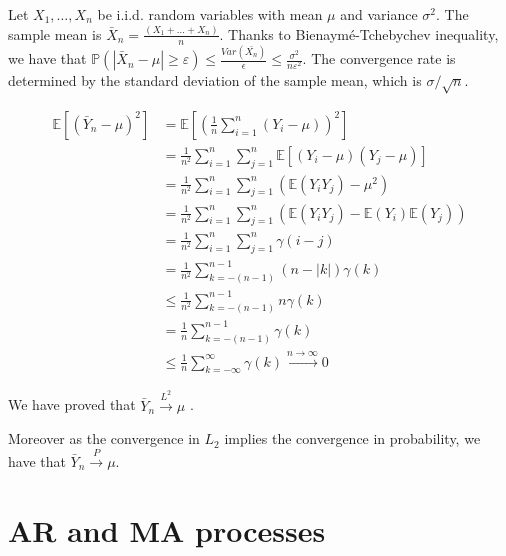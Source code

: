 \documentclass[11pt]{article}
\begin{document}
\begin{solution}  %

    Let $X_1, \dots, X_n$ be i.i.d. random variables with mean $\mu$ and variance $\sigma^2$. The sample mean  is $\bar{X}_n = \frac{(X_1+\dots+X_n)}{n}$. 
    Thanks to Bienaymé-Tchebychev inequality, we have that $\mathbb{P} (|\bar{X}_n - \mu| \geq \varepsilon) \leq  \frac{Var(\bar{X_n})}{\epsilon} \leq \frac{\sigma^2}{n\varepsilon^2}$.
    The convergence rate is determined by the standard deviation of the sample mean, which is $\sigma/\sqrt{n}$.

    \begin{align}
        \mathbb{E}[(\bar{Y}_n-\mu)^2] &= \mathbb{E}[(\frac{1}{n} \sum_{i=1}^n( Y_i - \mu))^2] \\
        &= \frac{1}{n^2} \sum_{i=1}^n \sum_{j=1}^n \mathbb{E}[(Y_i-\mu)(Y_j-\mu)] \\
        &= \frac{1}{n^2} \sum_{i=1}^n \sum_{j=1}^n (\mathbb{E}(Y_i Y_j) -\mu^2) \\
        &= \frac{1}{n^2} \sum_{i=1}^n \sum_{j=1}^n (\mathbb{E}(Y_i Y_j) -\mathbb{E}(Y_i) \mathbb{E}(Y_j)) \\
        &= \frac{1}{n^2} \sum_{i=1}^n \sum_{j=1}^n \gamma(i-j) \\
        &= \frac{1}{n^2} \sum_{k=-(n-1)}^{n-1} (n-|k|) \gamma(k) \\
        &\leq \frac{1}{n^2} \sum_{k=-(n-1)}^{n-1} n \gamma(k) \\
        &= \frac{1}{n} \sum_{k=-(n-1)}^{n-1} \gamma(k) \\
        &\leq \frac{1}{n} \sum_{k=-\infty}^{\infty} \gamma(k) \xrightarrow{n \to \infty} 0
    \end{align}

We have proved that $\bar{Y}_n \xrightarrow{L^2} \mu $ .

Moreover as  the convergence in $L_2$ implies the convergence in probability, we have that $\bar{Y}_n \xrightarrow{P} \mu $.
\end{solution}


\newpage
\section{AR and MA processes}
\end{document}

